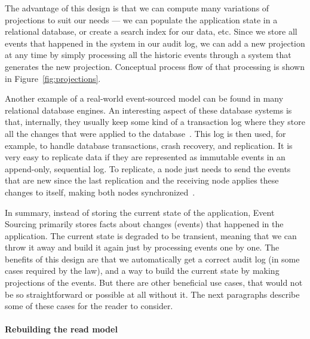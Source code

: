 \documentclass{book}
\begin{document}
The advantage of this design is that we can compute many variations of
projections to suit our needs --- we can populate the application state
in a relational database, or create a search index for our data, etc.
Since we store all events that happened in the system in our audit log,
we can add a new projection at any time by simply processing all the
historic events through a system that generates the new projection.
Conceptual process flow of that processing is shown in Figure~\ref{fig:projections}.

Another example of a real-world event-sourced model can be found in many
relational database engines. An interesting aspect of these database
systems is that, internally, they usually keep some kind of a
transaction log where they store all the changes that were applied to
the database~\cite{cqrsnu-eventsourcing}. This log is then used, for
example, to handle database transactions, crash recovery, and
replication. It is very easy to replicate data if they are represented
as immutable events in an append-only, sequential log. To replicate, a
node just needs to send the events that are new since the last
replication and the receiving node applies these changes to itself,
making both nodes synchronized~\cite{replica}.

In summary, instead of storing the current state of the application,
Event Sourcing primarily stores facts about changes (events) that
happened in the application. The current state is degraded to be
transient, meaning that we can throw it away and build it again just by
processing events one by one. The benefits of this design are that we
automatically get a correct audit log (in some cases required by the
law), and a way to build the current state by making projections of the
events. But there are other beneficial use cases, that would not be so
straightforward or possible at all without it. The next paragraphs
describe some of these cases for the reader to consider.


\paragraph{Rebuilding the read model}\label{rebuilding-the-read-model}
\end{document}
